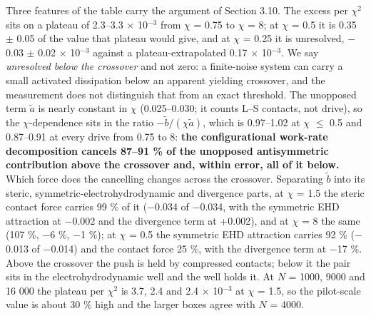 \documentclass[aps,pre,preprint,superscriptaddress,nofootinbib,longbibliography]{revtex4-2}
\begin{document}
Three features of the table carry the argument of Section 3.10. The excess per $\chi ^{2}$ sits on a plateau of 2.3--3.3 $\times$ 10$^{-3}$ from $\chi$ = 0.75 to $\chi$ = 8; at $\chi$ = 0.5 it is 0.35 $\pm$ 0.05 of the value that plateau would give, and at $\chi$ = 0.25 it is unresolved, $-$0.03 $\pm$ 0.02 $\times$ 10$^{-3}$ against a plateau-extrapolated 0.17 $\times$ 10$^{-3}$. We say \emph{unresolved below the crossover} and not zero: a finite-noise system can carry a small activated dissipation below an apparent yielding crossover, and the measurement does not distinguish that from an exact threshold. The unopposed term $\tilde a$ is nearly constant in $\chi$ (0.025--0.030; it counts L--S contacts, not drive), so the $\chi$-dependence sits in the ratio $-\tilde b/(\chi\tilde a)$, which is 0.97--1.02 at $\chi$ $\le$ 0.5 and 0.87--0.91 at every drive from 0.75 to 8: \textbf{the configurational work-rate decomposition cancels 87--91 \% of the unopposed antisymmetric contribution above the crossover and, within error, all of it below.} Which force does the cancelling changes across the crossover. Separating $\tilde b$ into its steric, symmetric-electrohydrodynamic and divergence parts, at $\chi$ = 1.5 the steric contact force carries 99 \% of it ($-$0.034 of $-$0.034, with the symmetric EHD attraction at $-$0.002 and the divergence term at +0.002), and at $\chi$ = 8 the same (107 \%, $-$6 \%, $-$1 \%); at $\chi$ = 0.5 the symmetric EHD attraction carries 92 \% ($-$0.013 of $-$0.014) and the contact force 25 \%, with the divergence term at $-$17 \%. Above the crossover the push is held by compressed contacts; below it the pair sits in the electrohydrodynamic well and the well holds it. At $N$ = 1000, 9000 and 16 000 the plateau per $\chi ^{2}$ is 3.7, 2.4 and 2.4 $\times$ 10$^{-3}$ at $\chi$ = 1.5, so the pilot-scale value is about 30 \% high and the larger boxes agree with $N$ = 4000.
\end{document}
